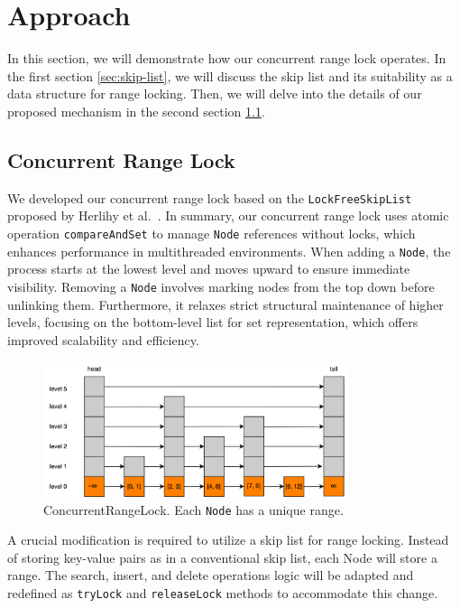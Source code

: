 \chapter{Approach}\label{ch:approach}
In this section, we will demonstrate how our concurrent range lock operates. 
In the first section \ref{sec:skip-list}, we will discuss the skip list and its suitability as a data structure for range locking. 
Then, we will delve into the details of our proposed mechanism in the second section \ref{sec:concurrent-range-lock}.

\section{Concurrent Range Lock}\label{sec:concurrent-range-lock}
We developed our concurrent range lock based on the \texttt{LockFreeSkipList} proposed by Herlihy et al.~\parencite{herlihy2020art}.
In summary, our concurrent range lock uses atomic operation \texttt{compareAndSet} to manage \texttt{Node} references without locks, which enhances performance in multithreaded environments.
When adding a \texttt{Node}, the process starts at the lowest level and moves upward to ensure immediate visibility.
Removing a \texttt{Node} involves marking nodes from the top down before unlinking them.
Furthermore, it relaxes strict structural maintenance of higher levels, focusing on the bottom-level list for set representation, which offers improved scalability and efficiency.

\begin{figure}[h]
    \centering
    \includegraphics[width=0.8\textwidth]{./figures/rangelock.png}
    \caption{ConcurrentRangeLock. Each \texttt{Node} has a unique range.}
    \label{fig:concurrent_range_lock}
\end{figure}

A crucial modification is required to utilize a skip list for range locking. Instead of storing key-value pairs as in a conventional skip list, each Node will store a range. 
The search, insert, and delete operations logic will be adapted and redefined as \texttt{tryLock} and \texttt{releaseLock} methods to accommodate this change.

